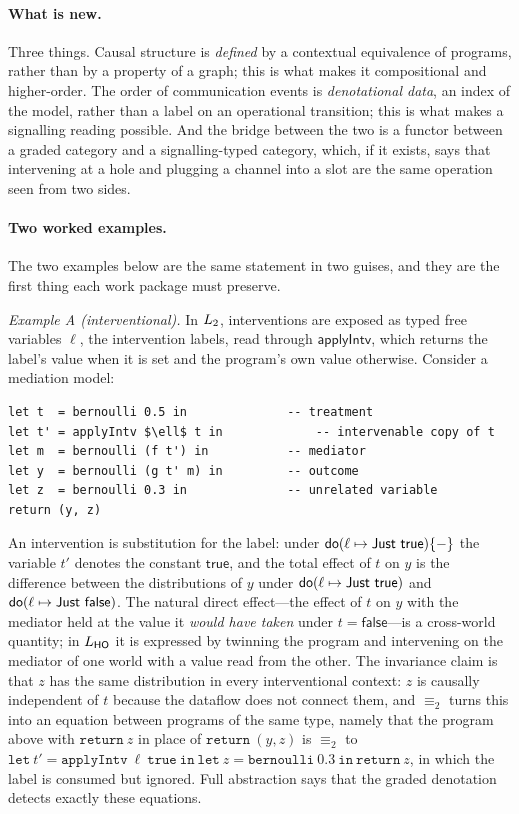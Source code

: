 \paragraph{What is new.} Three things. Causal structure is \emph{defined} by a contextual equivalence of programs, rather than by a property of a graph; this is what makes it compositional and higher-order. The order of communication events is \emph{denotational data}, an index of the model, rather than a label on an operational transition; this is what makes a signalling reading possible. And the bridge between the two is a functor between a graded category and a signalling-typed category, which, if it exists, says that intervening at a hole and plugging a channel into a slot are the same operation seen from two sides.

\paragraph{Two worked examples.} The two examples below are the same statement in two guises, and they are the first thing each work package must preserve.

\emph{Example A (interventional).} In $L_{2}$, interventions are exposed as typed free variables $\ell$, the intervention labels, read through $\mathsf{applyIntv}$, which returns the label's value when it is set and the program's own value otherwise. Consider a mediation model:
\begin{lstlisting}
let t  = bernoulli 0.5 in              -- treatment
let t' = applyIntv $\ell$ t in             -- intervenable copy of t
let m  = bernoulli (f t') in           -- mediator
let y  = bernoulli (g t' m) in         -- outcome
let z  = bernoulli 0.3 in              -- unrelated variable
return (y, z)
\end{lstlisting}
An intervention is substitution for the label: under $\dok(\ell\mapsto\mathsf{Just}\ \mathsf{true})\{-\}$ the variable $t'$ denotes the constant $\mathsf{true}$, and the total effect of $t$ on $y$ is the difference between the distributions of $y$ under $\dok(\ell\mapsto\mathsf{Just}\ \mathsf{true})$ and $\dok(\ell\mapsto\mathsf{Just}\ \mathsf{false})$. The natural direct effect---the effect of $t$ on $y$ with the mediator held at the value it \emph{would have taken} under $t=\mathsf{false}$---is a cross-world quantity; in $L_{\mathsf{HO}}$ it is expressed by twinning the program and intervening on the mediator of one world with a value read from the other. The invariance claim is that $z$ has the same distribution in every interventional context: $z$ is causally independent of $t$ because the dataflow does not connect them, and $\equiv_2$ turns this into an equation between programs of the same type, namely that the program above with $\mathtt{return}\ z$ in place of $\mathtt{return}\ (y,z)$ is $\equiv_2$ to $\mathtt{let}\ t' = \mathtt{applyIntv}\ \ell\ \mathtt{true}\ \mathtt{in}\ \mathtt{let}\ z = \mathtt{bernoulli}\ 0.3\ \mathtt{in}\ \mathtt{return}\ z$, in which the label is consumed but ignored. Full abstraction says that the graded denotation detects exactly these equations.

